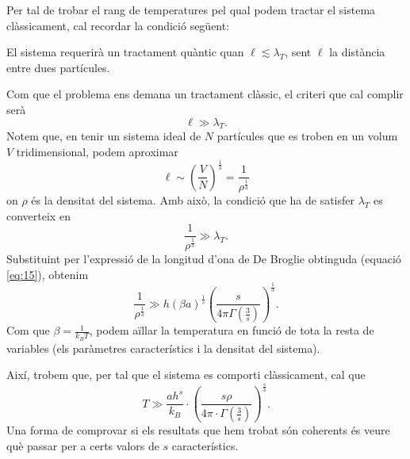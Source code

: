 \documentclass[a4paper, 10pt]{article}
\begin{document}
Per tal de trobar el rang de temperatures pel qual podem tractar el sistema clàssicament, cal recordar la condició següent:
\begin{center}
	El sistema requerirà un tractament quàntic quan $\ell \lesssim \lambda_T$, sent $\ell$ la distància entre dues partícules.
\end{center}
Com que el problema ens demana un tractament clàssic, el criteri que cal complir serà
\begin{equation}
	\ell \gg \lambda_T.
\end{equation}
Notem que, en tenir un sistema ideal de $N$ partícules que es troben en un volum $V$ tridimensional, podem aproximar
\begin{equation*}
	\ell \sim \left(\frac{V}{N}\right)^{\frac{1}{3}}=\frac{1}{\rho^{\frac{1}{3}}}
\end{equation*}
on $\rho$ és la densitat del sistema. Amb això, la condició que ha de satisfer $\lambda_T$ es converteix en
\begin{equation}
	\frac{1}{\rho^{\frac{1}{3}}} \gg \lambda_T.
\end{equation}
Substituint per l'expressió de la longitud d'ona de De Broglie obtinguda (equació \eqref{eq:15}), obtenim
\begin{equation}
	\frac{1}{\rho^{\frac{1}{3}}} \gg h(\beta a)^\frac{1}{s}\left(\frac{s}{4\pi \Gamma(\frac{3}{s})}\right)^{\frac{1}{3}}.
\end{equation}
Com que $\beta = \frac{1}{k_BT}$, podem aïllar la temperatura en funció de tota la resta de variables (els paràmetres característics i la densitat del sistema).

Així, trobem que, per tal que el sistema es comporti clàssicament, cal que
\begin{equation}
	\boxed{T \gg \frac{ah^s}{k_B}\cdot \left(\frac{s\rho}{4\pi\cdot\Gamma\left(\frac{3}{s}\right)}\right)^{\frac{s}{3}}}.
\end{equation}
Una forma de comprovar si els resultats que hem trobat són coherents és veure què passar per a certs valors de $s$ característics. 
\end{document}
